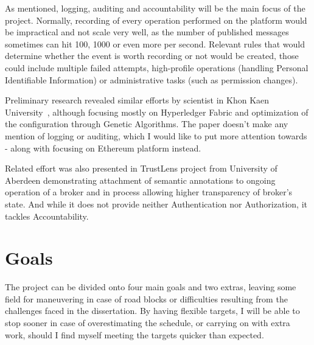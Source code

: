 \documentclass[a4paper,12pt]{article}
\begin{document}
As mentioned, logging, auditing and accountability will be the main focus of the project. Normally, recording of every operation performed on the platform would be impractical and not scale very well, as the number of published messages sometimes can hit 100, 1000 or even more per second. Relevant rules that would determine whether the event is worth recording or not would be created, those could include multiple failed attempts, high-profile operations (handling Personal Identifiable Information) or administrative tasks (such as permission changes).

Preliminary research revealed similar efforts by scientist in Khon Kaen University~\cite{8523942}, although focusing mostly on Hyperledger Fabric and optimization of the configuration through Genetic Algorithms. The paper doesn't make any mention of logging or auditing, which I would like to put more attention towards - along with focusing on Ethereum platform instead.

Related effort was also presented in TrustLens project from University of Aberdeen demonstrating attachment of semantic annotations to ongoing operation of a broker and in process allowing higher transparency of broker's state\cite{10.1145/3366610.3368099}. And while it does not provide neither Authentication nor Authorization, it tackles Accountability.

\section*{Goals}

The project can be divided onto four main goals and two extras, leaving some field for maneuvering in case of road blocks or difficulties resulting from the challenges faced in the dissertation. By having flexible targets, I will be able to stop sooner in case of overestimating the schedule, or carrying on with extra work, should I find myself meeting the targets quicker than expected. 
\end{document}
